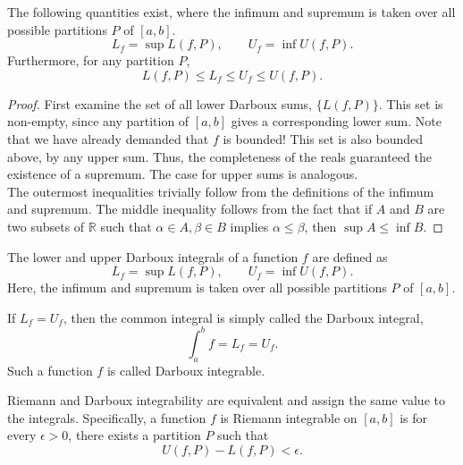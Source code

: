 \documentclass[11pt]{article}
\def\R{\mathbb{R}}
\theoremstyle{definition}
\theoremstyle{remark}
\numberwithin{equation}{module}
\begin{document}
    \begin{corollary}
        The following quantities exist, where the infimum and supremum is taken over
        all possible partitions $P$ of $[a, b]$. \[
            L_f = \sup L(f, P), \qquad U_f = \inf U(f, P).
        \] Furthermore, for any partition $P$, \[
            L(f, P) \leq L_f \leq U_f \leq U(f, P).
        \] 
    \end{corollary}
    \begin{proof}
        First examine the set of all lower Darboux sums, $\{L(f, P)\}$. This set is
        non-empty, since any partition of $[a, b]$ gives a corresponding lower sum.
        Note that we have already demanded that $f$ is bounded!
        This set is also bounded above, by any upper sum. Thus, the completeness of
        the reals guaranteed the existence of a supremum. The case for upper sums is
        analogous. \\

        \noindent The outermost inequalities trivially follow from the definitions
        of the infimum and supremum. The middle inequality follows from the fact
        that if $A$ and $B$ are two subsets of $\R$ such that $\alpha \in A, \beta
        \in B$ implies $\alpha \leq \beta$, then $\sup{A} \leq \inf{B}$.
    \end{proof}
    
    \begin{definition}
        The lower and upper Darboux integrals of a function $f$ are defined as \[
            L_f = \sup L(f, P), \qquad U_f = \inf U(f, P).
        \] Here, the infimum and supremum is taken over all possible partitions $P$
        of $[a, b]$.

        If $L_f = U_f$, then the common integral is simply called the Darboux
        integral, \[
            \int_a^b f = L_f = U_f.
        \] Such a function $f$ is called Darboux integrable.
    \end{definition}
    
    \begin{theorem}
        Riemann and Darboux integrability are equivalent and assign the same value
        to the integrals. Specifically, a function $f$ is Riemann integrable on $[a,
        b]$ is for every $\epsilon > 0$, there exists a partition $P$ such that \[
            U(f, P) - L(f, P) < \epsilon.
        \] 
    \end{theorem}
\end{document}
